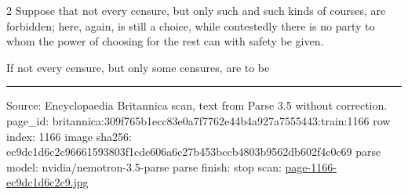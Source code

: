 \documentclass[10pt]{article}
\begin{document}
\begin{multicols}{2}
Suppose that not every censure, but only such and such kinds of courses, are forbidden; here, again, is still a choice, while contestedly there is no party to whom the power of choosing for the rest can with safety be given.

If not every censure, but only some censures, are to be

\end{multicols}
\vfill\par\noindent\rule{\linewidth}{0.4pt}\par
{\scriptsize\color{gray}\noindent Source: Encyclopaedia Britannica scan, text from Parse 3.5 without correction. page\_id: britannica:309f765b1ecc83e0a7f7762e44b4a927a7555443:train:1166 \quad row index: 1166 \quad image sha256: ec9dc1d6c2c96661593803f1cde606a6c27b453bccb4803b9562db602f4c0c69 \quad parse model: nvidia/nemotron-3.5-parse \quad parse finish: stop \quad scan: \href{../scans/page-1166-ec9dc1d6c2c9.jpg}{page-1166-ec9dc1d6c2c9.jpg}\par}
\end{document}
